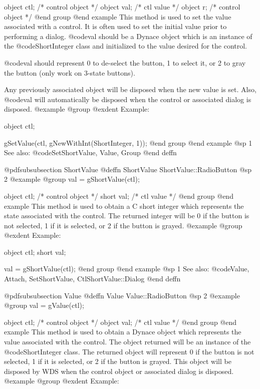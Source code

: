 object  ctl;    /*  control object  */
object  val;    /*  ctl value       */
object  r;      /*  control object  */
@end group
@end example
This method is used to set the value associated with a control.  It is
often used to set the initial value prior to performing a dialog.
@code{val} should be a Dynace object which is an instance of the
@code{ShortInteger} class and initialized to the value desired for the
control.

@code{val} should represent 0 to de-select the button, 1 to select it, or 2 to
gray the button (only work on 3-state buttons).

Any previously associated object will be disposed when the new value is set.
Also, @code{val} will automatically be disposed when the control or associated
dialog is disposed.
@example
@group
@exdent Example:

object  ctl;

gSetValue(ctl, gNewWithInt(ShortInteger, 1));
@end group
@end example
@sp 1
See also:  @code{SetShortValue, Value, Group}
@end deffn













@pdfsubsubsection {ShortValue}
@deffn {ShortValue} ShortValue::RadioButton
@sp 2
@example
@group
val = gShortValue(ctl);

object  ctl;   /*  control object  */
short   val;   /*  ctl value       */
@end group
@end example
This method is used to obtain a C short integer which represents the
state associated with the control.  The returned integer will be 0 if
the button is not selected, 1 if it is selected, or 2 if the button is grayed.
@example
@group
@exdent Example:

object  ctl;
short   val;

val = gShortValue(ctl);
@end group
@end example
@sp 1
See also:  @code{Value, Attach, SetShortValue, CtlShortValue::Dialog}
@end deffn













@pdfsubsubsection {Value}
@deffn {Value} Value::RadioButton
@sp 2
@example
@group
val = gValue(ctl);

object  ctl;   /*  control object  */
object  val;   /*  ctl value       */
@end group
@end example
This method is used to obtain a Dynace object which represents the value
associated with the control.  The object returned will be an instance of
the @code{ShortInteger} class.  The returned object will represent 0 if
the button is not selected, 1 if it is selected, or 2 if the button is grayed.
This object will be disposed by WDS when the control object or
associated dialog is disposed.
@example
@group
@exdent Example:

